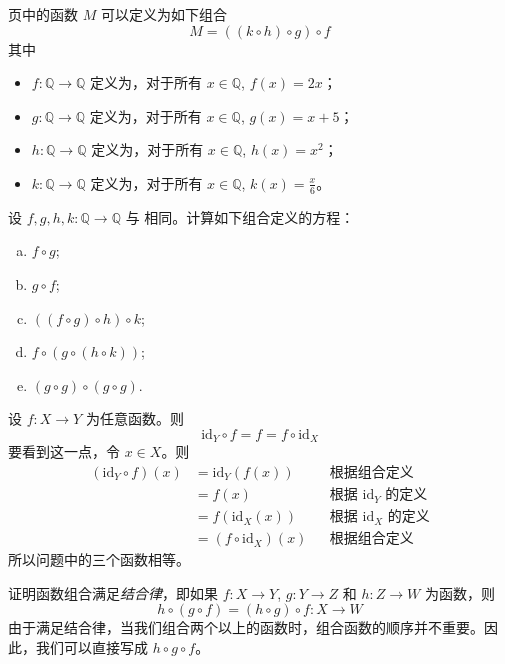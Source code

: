 \begin{example}
\label{exDecompositionOfFunctionQToQ}
\pageref{txtAlgorithmicallyDefinedFunctionExample} 页中的函数 $M$ 可以定义为如下组合
\[ M = ((k \circ h) \circ g) \circ f \]
其中
\begin{itemize}
\item $f : \mathbb{Q} \to \mathbb{Q}$ 定义为，对于所有 $x \in \mathbb{Q}$, $f(x)=2x$；
\item $g : \mathbb{Q} \to \mathbb{Q}$ 定义为，对于所有 $x \in \mathbb{Q}$, $g(x)=x+5$；
\item $h : \mathbb{Q} \to \mathbb{Q}$ 定义为，对于所有 $x \in \mathbb{Q}$, $h(x)=x^2$；
\item $k : \mathbb{Q} \to \mathbb{Q}$ 定义为，对于所有 $x \in \mathbb{Q}$, $k(x)=\frac{x}{6}$。
\end{itemize}
\end{example}

\begin{exercise}
设 $f,g,h,k : \mathbb{Q} \to \mathbb{Q}$ 与  相同。计算如下组合定义的方程：
\begin{enumerate}[(a)]
\item $f \circ g$;
\item $g \circ f$;
\item $((f \circ g) \circ h) \circ k$;
\item $f \circ (g \circ (h \circ k))$;
\item $(g \circ g) \circ (g \circ g)$.
\end{enumerate}
\end{exercise}

\begin{example}
\label{exCompositionWithIdentityIsTrivial}
设 $f : X \to Y$ 为任意函数。则
\[ \mathrm{id}_Y \circ f = f = f \circ \mathrm{id}_X \]
要看到这一点，令 $x \in X$。则
\begin{align*}
(\mathrm{id}_Y \circ f)(x) &= \mathrm{id}_Y(f(x)) && \text{根据组合定义} \\
&= f(x) && \text{根据 $\mathrm{id}_Y$ 的定义} \\
&= f(\mathrm{id}_X(x)) && \text{根据 $\mathrm{id}_X$ 的定义} \\
&= (f \circ \mathrm{id}_X)(x) && \text{根据组合定义}
\end{align*}
所以问题中的三个函数相等。
\end{example}

\begin{exercise}
\label{exCompositionIsAssociative}
证明函数组合满足\textit{结合律}，即如果 $f : X \to Y$, $g : Y \to Z$ 和 $h : Z \to W$ 为函数，则
\[ h \circ (g \circ f) = (h \circ g) \circ f : X \to W \]
由于满足结合律，当我们组合两个以上的函数时，组合函数的顺序并不重要。因此，我们可以直接写成 $h \circ g \circ f$。
\end{exercise}

